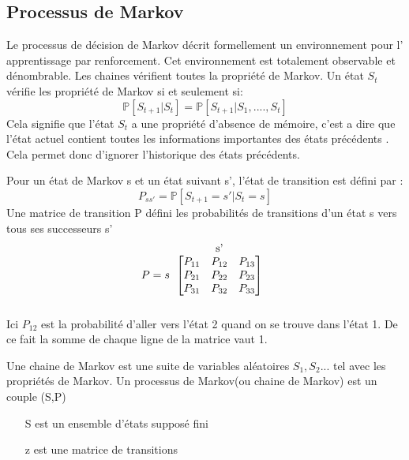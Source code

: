 \documentclass[a4paper,10pt]{article}
\begin{document}
\subsection{Processus de Markov}
Le processus de décision de Markov décrit formellement un environnement pour l' apprentissage par renforcement. Cet environnement est totalement observable et dénombrable.
Les chaines vérifient toutes la propriété de Markov. Un état $S_t$ vérifie les propriété de Markov si et seulement si:
\[\mathbb{P}[S_{t+1}|S_t]=\mathbb{P}[S_{t+1}|S_1,....,S_t]\]
Cela signifie que l'état $S_t$ a  une propriété d'absence de mémoire, c'est a dire que l'état actuel contient toutes les informations importantes des états précédents . Cela permet donc d'ignorer l'historique des états précédents.
\par
Pour un état de Markov s et un état suivant s', l'état de transition est défini par : \[P_{ss'}=\mathbb{P}[S_{t+1}=s'|S_t=s]\]
Une matrice de transition P défini les probabilités de transitions d'un état s vers tous ses successeurs s' \[P = s
\begin{tabular}{c}
 s'\\
$$$\begin{bmatrix}
P_{11} & P_{12} & P_{13} \\
P_{21} & P_{22} & P_{23} \\
P_{31} & P_{32} & P_{33}
\end{bmatrix}$$$\\
\\
\end{tabular}\]
Ici $P_{12}$ est la probabilité d'aller vers l'état 2 quand on se trouve dans l'état 1. De ce fait la somme de chaque ligne de la matrice vaut 1.\par
Une chaine de Markov est une suite de variables aléatoires $S_1,S_2$... tel avec les propriétés de Markov. Un processus de Markov(ou chaine de Markov) est un couple (S,P)
\begin{itemize}
\item[S] est un ensemble d'états supposé fini
\item[z] est une matrice de transitions 
\end{itemize}
\end{document}
